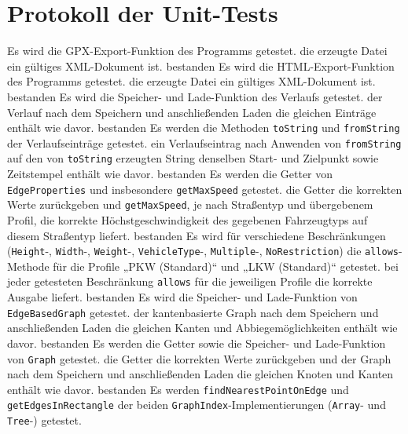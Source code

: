 \documentclass[a4paper, 11pt]{article}
\newcommand{\code}[1]{\texttt{#1}}
\begin{document}
\section{Protokoll der Unit-Tests}
\begin{itemize}
     {Es wird die GPX-Export-Funktion des Programms getestet.}
     {die erzeugte Datei ein gültiges XML-Dokument ist.}
     {bestanden}
     {Es wird die HTML-Export-Funktion des Programms getestet.}
     {die erzeugte Datei ein gültiges XML-Dokument ist.}
     {bestanden}
     {Es wird die Speicher- und Lade-Funktion des Verlaufs getestet.}
     {der Verlauf nach dem Speichern und anschließenden Laden die gleichen Einträge enthält wie davor.}
     {bestanden}
     {Es werden die Methoden \code{toString} und \code{fromString} der Verlaufseinträge getestet.}
     {ein Verlaufseintrag nach Anwenden von \code{fromString} auf den von \code{toString} erzeugten String denselben Start- und Zielpunkt sowie Zeitstempel enthält wie davor.}
     {bestanden}
     {Es werden die Getter von \code{EdgeProperties} und insbesondere \code{get\-Max\-Speed} getestet.}
     {die Getter die korrekten Werte zurückgeben und \code{getMaxSpeed}, je nach Straßentyp und übergebenem Profil, die korrekte Höchstgeschwindigkeit des gegebenen Fahrzeugtyps auf diesem Straßentyp liefert.}
     {bestanden}
     {Es wird für verschiedene Beschränkungen (\mbox{\code{Height}-,} \mbox{\code{Width}-,} \mbox{\code{Weight}-,} \mbox{\code{VehicleType}-,} \mbox{\code{Multiple}-,} \code{NoRestriction}) die \code{allows}-Methode für die Profile „PKW (Standard)“ und „LKW (Standard)“ getestet.}
     {bei jeder getesteten Beschränkung \code{allows} für die jeweiligen Profile die korrekte Ausgabe liefert.}
     {bestanden}
     {Es wird die Speicher- und Lade-Funktion von \code{EdgeBasedGraph} getestet.}
     {der kantenbasierte Graph nach dem Speichern und anschließenden Laden die gleichen Kanten und Abbiegemöglichkeiten enthält wie davor.}
     {bestanden}
     {Es werden die Getter sowie die Speicher- und Lade-Funktion von \code{Graph} getestet.}
     {die Getter die korrekten Werte zurückgeben und der Graph nach dem Speichern und anschließenden Laden die gleichen Knoten und Kanten enthält wie davor.}
     {bestanden}
     {Es werden \code{findNearestPointOnEdge} und \code{getEdgesInRectangle} der beiden \code{GraphIndex}-Implementierungen (\code{Array}- und \code{Tree}-) getestet.}

\end{itemize}
\end{document}
